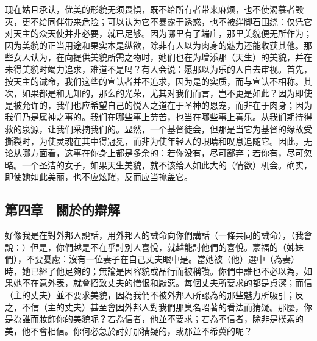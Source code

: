 现在姑且承认，优美的形貌无须畏惧，既不给所有者带来麻烦，也不使渴慕者毁灭，更不给同伴带来危险；可以认为它不暴露于诱惑，也不被绊脚石围绕：仅凭它对天主的众天使并非必要，就已足够。因为哪里有了端庄，那里美貌便无所作为；因为美貌的正当用途和果实本是纵欲，除非有人以为肉身的魅力还能收获其他。那些女人认为，在向提供美貌所需之物时，她们也在为增添那（天生）的美貌，并在未得美貌时竭力追求，难道不是吗？有人会说：愿那以为乐的人自去审视。首先，按天主的诫命，我们这些的宣认者并不追求，因为是的实质，而与宣认不相称。其次，如果都是和无知的，那么的光荣，尤其对我们而言，岂不更是如此？因为即使是被允许的，我们也应希望自己的悦人之道在于圣神的恩宠，而非在于肉身；因为我们乃是属神之事的。我们在哪些事上劳苦，也当在哪些事上喜乐。从我们期待得救的泉源，让我们采摘我们的。显然，一个基督徒会，但那是当它为基督的缘故受撕裂时，为使灵魂在其中得冠冕，而非为使年轻人的眼睛和叹息追随它。因此，无论从哪方面看，这事在你身上都是多余的：若你没有，尽可鄙弃；若你有，尽可忽略。一个圣洁的女子，如果天生美貌，就不该给人如此大的（情欲）机会。确实，即使她如此美丽，也不应炫耀，反而应当掩盖它。\par


\subsection{第四章　關於的辯解}

好像我是在對外邦人說話，用外邦人的誡命向你們講話（一條共同的誡命），（我會說：）但是，你們越是不在乎討別人喜悅，就越能討他們的喜悅。蒙福的（姊妹們），不要憂慮：沒有一位妻子在自己丈夫眼中是。當她被（他）選中（為妻）時，她已經了他足夠的；無論是因容貌或品行而被稱讚。你們中誰也不必以為，如果她不在意外表，就會招致丈夫的憎恨和厭惡。每個丈夫所要求的都是貞潔；而信（主的丈夫）並不要求美貌，因為我們不被外邦人所認為的那些魅力所吸引；反之，不信（主的丈夫）甚至會因外邦人對我們那臭名昭著的看法而猜疑。那麼，你是為誰而妝飾你的美貌呢？若為信者，他並不要求；若為不信者，除非是樸素的美，他不會相信。你何必急於討好那猜疑的，或那並不希冀的呢？\par


